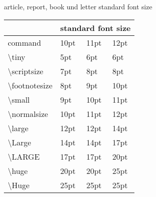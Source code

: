 
article, report, book und letter standard font size 

\begin{table}[]
    \begin{tabular}{|l|l|l|l|}
    \hline
                                    & \multicolumn{3}{l|}{standard font size} \\ \hline
    command                         &  10pt        & 11pt       & 12pt        \\ \hline
    \textbackslash{}tiny            &  5pt         & 6pt        & 6pt         \\ \hline
    \textbackslash{}scriptsize      &  7pt        &	 8pt	    & 8pt         \\ \hline
    \textbackslash{}footnotesize    &  8pt        &	 9pt	    & 10pt        \\ \hline
    \textbackslash{}small           &  9pt        &	 10pt       & 11pt        \\ \hline
    \textbackslash{}normalsize     &   10pt       &	 11pt       & 12pt        \\ \hline
    \textbackslash{}large          &   12pt       &	 12pt       & 14pt        \\ \hline
    \textbackslash{}Large          &   14pt       &	 14pt       & 17pt        \\ \hline
    \textbackslash{}LARGE    	   &   17pt       &	 17pt       & 20pt        \\ \hline
    \textbackslash{}huge           &   20pt       &	 20pt       & 25pt        \\ \hline
    \textbackslash{}Huge           &   25pt       &	 25pt       & 25pt        \\ \hline
    \end{tabular}
    \end{table}
